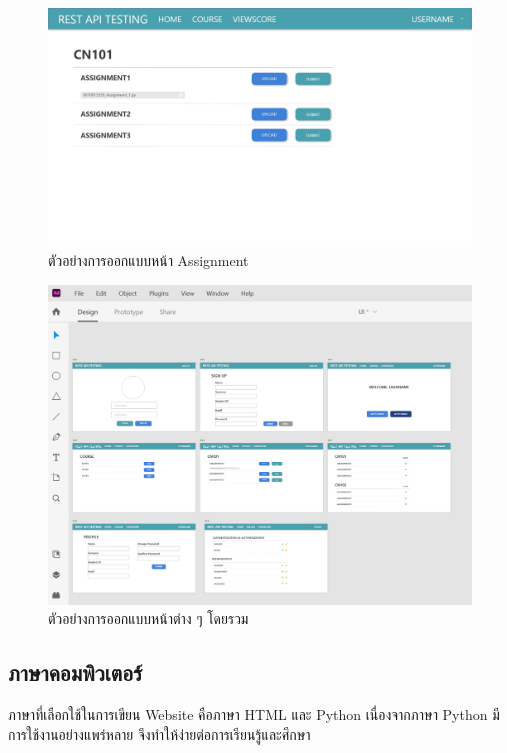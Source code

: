 \begin{figure}[!thb]
	\captionsetup{justification=centering}
	\centering
	\includegraphics[width=5in]{figures/assignmentxd.jpg}
	\caption{ตัวอย่างการออกแบบหน้า Assignment}
	\label{fig:assignmentxd}
\end{figure}

\begin{figure}[!thb]
	\captionsetup{justification=centering}
	\centering
	\includegraphics[width=5in]{figures/mockup.png}
	\caption{ตัวอย่างการออกแบบหน้าต่าง ๆ โดยรวม}
	\label{fig:mockup}
\end{figure}
\newpage

\subsection{ภาษาคอมพิวเตอร์}
ภาษาที่เลือกใช้ในการเขียน Website คือภาษา HTML และ Python เนื่องจากภาษา Python มีการใช้งานอย่างแพร่หลาย จึงทำให้ง่ายต่อการเรียนรู้และศึกษา

